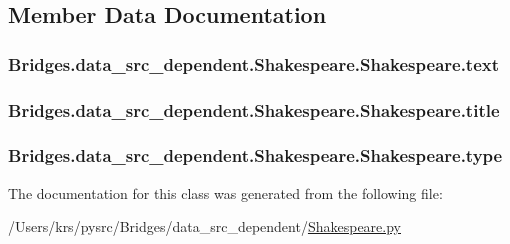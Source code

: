 \subsection{Member Data Documentation}
\hypertarget{class_bridges_1_1data__src__dependent_1_1_shakespeare_1_1_shakespeare_aca881efeb7708645e304bedd8bfdfbb1}{}
\subsubsection[{text}]{\setlength{\rightskip}{0pt plus 5cm}Bridges.\+data\+\_\+src\+\_\+dependent.\+Shakespeare.\+Shakespeare.\+text}\label{class_bridges_1_1data__src__dependent_1_1_shakespeare_1_1_shakespeare_aca881efeb7708645e304bedd8bfdfbb1}
\hypertarget{class_bridges_1_1data__src__dependent_1_1_shakespeare_1_1_shakespeare_ac3970c59e0d01f6d8a7037cd129a4c7d}{}
\subsubsection[{title}]{\setlength{\rightskip}{0pt plus 5cm}Bridges.\+data\+\_\+src\+\_\+dependent.\+Shakespeare.\+Shakespeare.\+title}\label{class_bridges_1_1data__src__dependent_1_1_shakespeare_1_1_shakespeare_ac3970c59e0d01f6d8a7037cd129a4c7d}
\hypertarget{class_bridges_1_1data__src__dependent_1_1_shakespeare_1_1_shakespeare_ab841234a24c7982c99bb69ebe29cd17a}{}
\subsubsection[{type}]{\setlength{\rightskip}{0pt plus 5cm}Bridges.\+data\+\_\+src\+\_\+dependent.\+Shakespeare.\+Shakespeare.\+type}\label{class_bridges_1_1data__src__dependent_1_1_shakespeare_1_1_shakespeare_ab841234a24c7982c99bb69ebe29cd17a}


The documentation for this class was generated from the following file\+:\begin{DoxyCompactItemize}
\item 
/\+Users/krs/pysrc/\+Bridges/data\+\_\+src\+\_\+dependent/\hyperlink{_shakespeare_8py}{Shakespeare.\+py}\end{DoxyCompactItemize}
